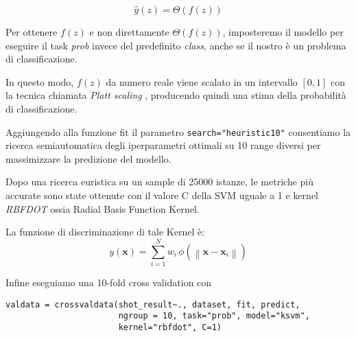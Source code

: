$$\hat{y}(z) = \Theta(f(z))$$

Per ottenere $f(z)$ e non direttamente $\Theta(f(z))$, imposteremo il modello per eseguire il task \textit{prob} invece del predefinito \textit{class}, anche se il nostro è un problema di classificazione.

In questo modo, $f(z)$ da numero reale viene scalato in un intervallo $[0, 1]$ con la tecnica chiamata \textit{Platt scaling} \cite{Platt99probabilisticoutputs}, producendo quindi una stima della probabilità di classificazione.
\par
Aggiungendo alla funzione fit il parametro \texttt{search="heuristic10"} consentiamo la ricerca semiautomatica degli iperparametri ottimali su 10 range diversi per massimizzare la predizione del modello.
\par
Dopo una ricerca euristica su un sample di 25000 istanze, le metriche più accurate sono state ottenute con il valore C della SVM uguale a 1 e kernel \textit{RBFDOT} ossia Radial Basis Function Kernel.
\par
La funzione di discriminazione di tale Kernel è:
\begin{equation}
y\left(\mathbf{x}\right) = \sum_{i=1}^N w_i \, \phi\left(\left\|\mathbf{x} - \mathbf{x}_i\right\|\right)\label{RBFK}
\end{equation}

Infine eseguiamo una 10-fold cross validation con

\begin{verbatim}
valdata = crossvaldata(shot_result~., dataset, fit, predict,
                       ngroup = 10, task="prob", model="ksvm",
                       kernel="rbfdot", C=1)
\end{verbatim}